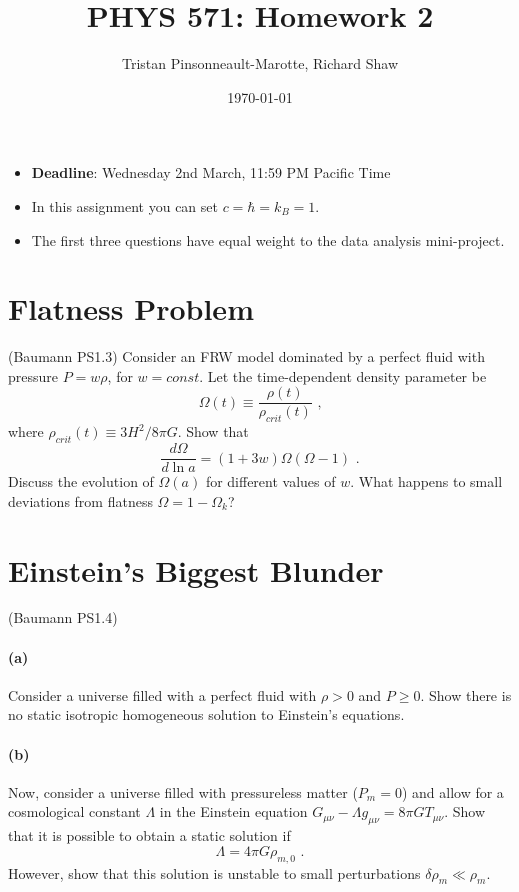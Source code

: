\documentclass[12pt]{article}
\author{Tristan Pinsonneault-Marotte, Richard Shaw}
\title{PHYS 571: Homework 2}
\date{\today}
\begin{document}
\maketitle

\begin{itemize}
    \item \textbf{Deadline}: Wednesday 2nd March, 11:59 PM Pacific Time
    \item In this assignment you can set $c = \hbar = k_B = 1$.
    \item The first three questions have equal weight to the data analysis mini-project.
\end{itemize}




\section{Flatness Problem}

(Baumann PS1.3) Consider an FRW model dominated by a perfect fluid with pressure
$P = w\rho$, for $w = const$. Let the time-dependent density parameter be
\begin{equation}
    \Omega(t) \equiv \frac{\rho(t)}{\rho_{crit}(t)} \text{ ,}
\end{equation}
where $\rho_{crit}(t) \equiv 3 H^2 / 8 \pi G$. Show that
\begin{equation}
    \frac{d \Omega}{d \ln a} = \left(1 +  3w\right) \Omega
    \left(\Omega - 1\right) \text{ .}
\end{equation}
Discuss the evolution of $\Omega(a)$ for different values of $w$. What happens
to small deviations from flatness $\Omega = 1 - \Omega_k$?


\section{Einstein's Biggest Blunder}

(Baumann PS1.4)

\paragraph{(a)} Consider a universe filled with a perfect fluid with $\rho > 0$
and $P \geq 0$. Show there is no static isotropic homogeneous solution to
Einstein's equations.

\paragraph{(b)} Now, consider a universe filled with pressureless matter ($P_m =
0$) and allow for a cosmological constant $\Lambda$ in the Einstein equation
$G_{\mu\nu} - \Lambda g_{\mu\nu} = 8\pi G T_{\mu\nu}$. Show that it is possible to obtain a static solution if
\begin{equation}
    \Lambda = 4 \pi G \rho_{m,0} \text{ .}
\end{equation}
However, show that this solution is unstable to small perturbations $\delta
\rho_m \ll \rho_m$.
\end{document}
